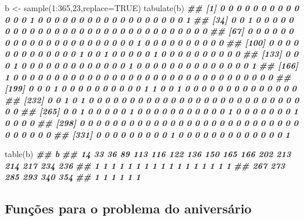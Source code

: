 \documentclass[
  11pt]{report}
\newenvironment{Shaded}{\begin{snugshade}}{\end{snugshade}}
\newcommand{\AttributeTok}[1]{\textcolor[rgb]{0.77,0.63,0.00}{#1}}
\newcommand{\ConstantTok}[1]{\textcolor[rgb]{0.00,0.00,0.00}{#1}}
\newcommand{\DecValTok}[1]{\textcolor[rgb]{0.00,0.00,0.81}{#1}}
\newcommand{\DocumentationTok}[1]{\textcolor[rgb]{0.56,0.35,0.01}{\textbf{\textit{#1}}}}
\newcommand{\FunctionTok}[1]{\textcolor[rgb]{0.00,0.00,0.00}{#1}}
\newcommand{\NormalTok}[1]{#1}
\newcommand{\OtherTok}[1]{\textcolor[rgb]{0.56,0.35,0.01}{#1}}
\newcommand{\SpecialCharTok}[1]{\textcolor[rgb]{0.00,0.00,0.00}{#1}}
\renewenvironment{Shaded}{
    \begin{mdframed}[%
      roundcorner=2pt,%
      innerleftmargin=5pt,%
      innerrightmargin=5pt,%
      topline=true,%
      leftline=true,%
      rightline=true,%
      bottomline=true,%
      linewidth=0.5pt,%
      linecolor=black!20,%
      backgroundcolor=black!2,%
      skipabove=2ex,%
      skipbelow=2.5ex%
    ]%
  }
  {
    \end{mdframed}
  }
\begin{document}
\begin{Shaded}
\begin{Highlighting}[]
\NormalTok{b }\OtherTok{\textless{}{-}} \FunctionTok{sample}\NormalTok{(}\DecValTok{1}\SpecialCharTok{:}\DecValTok{365}\NormalTok{,}\DecValTok{23}\NormalTok{,}\AttributeTok{replace=}\ConstantTok{TRUE}\NormalTok{)}
\FunctionTok{tabulate}\NormalTok{(b)}
\DocumentationTok{\#\#   [1] 0 0 0 0 0 0 0 0 0 0 0 0 0 1 0 0 0 0 0 0 0 0 0 0 0 0 0 0 0 0 0 0 1}
\DocumentationTok{\#\#  [34] 0 0 1 0 0 0 0 0 0 0 0 0 0 0 0 0 0 0 0 0 0 0 0 0 0 0 0 0 0 0 0 0 0}
\DocumentationTok{\#\#  [67] 0 0 0 0 0 0 0 0 0 0 0 0 0 0 0 0 0 0 0 0 0 0 1 0 0 0 0 0 0 0 0 0 0}
\DocumentationTok{\#\# [100] 0 0 0 0 0 0 0 0 0 0 0 0 0 1 0 0 1 0 0 0 0 0 1 0 0 0 0 0 0 0 0 0 0}
\DocumentationTok{\#\# [133] 0 0 0 1 0 0 0 0 0 0 0 0 0 0 0 0 0 1 0 0 0 0 0 0 0 0 0 0 0 0 0 0 1}
\DocumentationTok{\#\# [166] 1 0 0 0 0 0 0 0 0 0 0 0 0 0 0 0 0 0 0 0 0 0 0 0 0 0 0 0 0 0 0 0 0}
\DocumentationTok{\#\# [199] 0 0 0 1 0 0 0 0 0 0 0 0 0 0 1 1 0 0 1 0 0 0 0 0 0 0 0 0 0 0 0 0 0}
\DocumentationTok{\#\# [232] 0 0 1 0 1 0 0 0 0 0 0 0 0 0 0 0 0 0 0 0 0 0 0 0 0 0 0 0 0 0 0 0 0}
\DocumentationTok{\#\# [265] 0 0 1 0 0 0 0 0 1 0 0 0 0 0 0 0 0 0 0 0 1 0 0 0 0 0 0 0 1 0 0 0 0}
\DocumentationTok{\#\# [298] 0 0 0 0 0 0 0 0 0 0 0 0 0 0 0 0 0 0 0 0 0 0 0 0 0 0 0 0 0 0 0 0 0}
\DocumentationTok{\#\# [331] 0 0 0 0 0 0 0 0 0 1 0 0 0 0 0 0 0 0 0 0 0 0 0 1}
\end{Highlighting}
\end{Shaded}

\begin{Shaded}
\begin{Highlighting}[]
\FunctionTok{table}\NormalTok{(b)}
\DocumentationTok{\#\# b}
\DocumentationTok{\#\#  14  33  36  89 113 116 122 136 150 165 166 202 213 214 217 234 236 }
\DocumentationTok{\#\#   1   1   1   1   1   1   1   1   1   1   1   1   1   1   1   1   1 }
\DocumentationTok{\#\# 267 273 285 293 340 354 }
\DocumentationTok{\#\#   1   1   1   1   1   1}
\end{Highlighting}
\end{Shaded}

\hypertarget{funuxe7uxf5es-para-o-problema-do-aniversuxe1rio}{%
\subsection*{Funções para o problema do aniversário}\label{funuxe7uxf5es-para-o-problema-do-aniversuxe1rio}}
\end{document}
